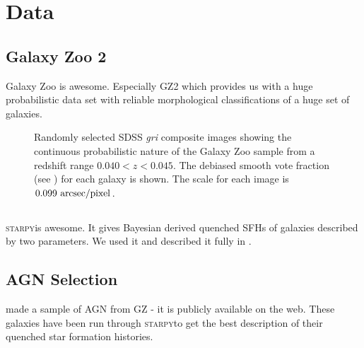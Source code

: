 \documentclass[useAMS,usenatbib]{mn2e}
\def\starpy {\textsc{starpy}}
\begin{document}
\section{Data}

\subsection{Galaxy Zoo 2}\label{galzoo}

Galaxy Zoo is awesome. Especially GZ2 which provides us with a huge probabilistic data set with reliable morphological classifications of a huge set of galaxies. 

\begin{figure}
\caption{{\newchange Randomly selected SDSS \emph{gri} composite images showing the continuous probabilistic nature of the Galaxy Zoo sample from a redshift range $0.040 < z < 0.045$. The debiased smooth vote fraction (see \citealt{GZ2}) for each galaxy is shown. The scale for each image is $0.099~\rm{arcsec/pixel}$.}}
\label{mosaic}
\end{figure}


\subsection{}

\starpy is awesome. It gives Bayesian derived quenched SFHs of galaxies described by two parameters. We used it and described it fully in \cite{Sme2015}. 

\subsection{AGN Selection}

\cite{Sch2010} made a sample of AGN from GZ - it is publicly available on the web. These galaxies have been run through \starpy to get the best description of their quenched star formation histories. 
\end{document}
